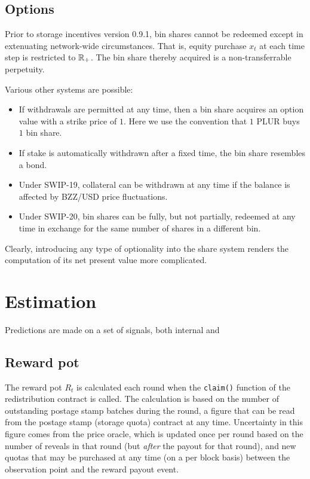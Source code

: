 \subsection{Options}

Prior to storage incentives version 0.9.1, bin shares cannot be redeemed except in extenuating network-wide circumstances.
%
That is, equity purchase $x_t$ at each time step is restricted to $\mathbb{R}_+$.
%
The bin share thereby acquired is a non-transferrable perpetuity.

Various other systems are possible:
%
\begin{itemize}
  \item 
    If withdrawals are permitted at any time, then a bin share acquires an option value with a strike price of $1$.
    Here we use the convention that $1$ PLUR buys $1$ bin share.

  \item
    If stake is automatically withdrawn after a fixed time, the bin share resembles a bond.

  \item
    Under SWIP-19, collateral can be withdrawn at any time if the balance is affected by BZZ/USD  price fluctuations.
    
  \item
    Under SWIP-20, bin shares can be fully, but not partially, redeemed at any time in exchange for the same number of shares in a different bin.
\end{itemize}
%
Clearly, introducing any type of optionality into the share system renders the computation of its net present value more complicated.

\newpage

\section{Estimation}

Predictions are made on a set of signals, both internal and

\subsection{Reward pot}

The reward pot $R_t$ is calculated each round when the \texttt{claim()} function of the redistribution contract is called.
%
The calculation is based on the number of outstanding postage stamp batches during the round, a figure that can be read from the postage stamp (storage quota) contract at any time.
%
Uncertainty in this figure comes from the price oracle, which is updated once per round based on the number of reveals in that round (but \emph{after} the payout for that round), and new quotas that may be purchased at any time (on a per block basis) between the observation point and the reward payout event.

